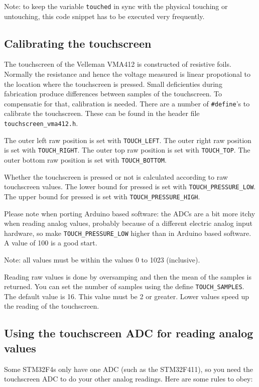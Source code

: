 \documentclass[12pt]{article}
\begin{document}
Note: to keep the variable \lstinline|touched| in sync with the physical touching or untouching, this code snippet has to be executed very frequently.

\subsection{Calibrating the touchscreen}
\label{sec:calibrating}
The touchscreen of the Velleman VMA412 is constructed of resistive foils. Normally the resistance and hence the voltage measured is linear propotional to the location where the touchscreen is pressed. Small deficienties during fabrication produce differences between samples of the touchscreen. To compensatie for that, calibration is needed. There are a number of \lstinline|#define|'s to calibrate the touchscreen. These can be found in the header file \lstinline|touchscreen_vma412.h|.

The outer left raw position is set with \lstinline|TOUCH_LEFT|. The outer right raw position is set with \lstinline|TOUCH_RIGHT|. The outer top raw position is set with \lstinline|TOUCH_TOP|. The outer bottom raw position is set with \lstinline|TOUCH_BOTTOM|.

Whether the touchscreen is pressed or not is calculated according to raw touchscreen values. The lower bound for pressed is set with \lstinline|TOUCH_PRESSURE_LOW|. The upper bound for pressed is set with \lstinline|TOUCH_PRESSURE_HIGH|.

Please note when porting Arduino based software: the ADCs are a bit more itchy when reading analog values, probably because of a different electric analog input hardware, so make \lstinline|TOUCH_PRESSURE_LOW| higher than in Arduino based software. A value of 100 is a good start.

Note: all values must be within the values 0 to 1023 (inclusive).

Reading raw values is done by oversamping and then the mean of the samples is returned. You can set the number of samples using the define \lstinline|TOUCH_SAMPLES|. The default value is 16. This value must be 2 or greater. Lower values speed up the reading of the touchscreen.

\subsection{Using the touchscreen ADC for reading analog values}
Some STM32F4s only have one ADC (such as the STM32F411), so you need the touchscreen ADC to do your other analog readings. Here are some rules to obey:
\end{document}

